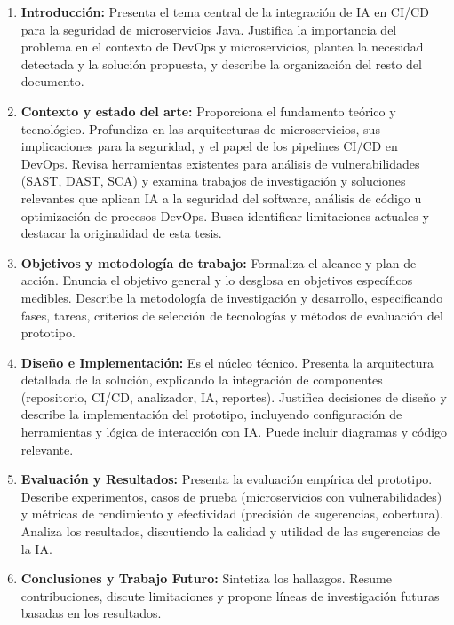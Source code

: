 \begin{enumerate}
\item \textbf{Introducción:} Presenta el tema central de la integración de IA en CI/CD para la seguridad de microservicios Java. Justifica la importancia del problema en el contexto de DevOps y microservicios, plantea la necesidad detectada y la solución propuesta, y describe la organización del resto del documento.

\item \textbf{Contexto y estado del arte:} Proporciona el fundamento teórico y tecnológico. Profundiza en las arquitecturas de microservicios, sus implicaciones para la seguridad, y el papel de los pipelines CI/CD en DevOps. Revisa herramientas existentes para análisis de vulnerabilidades (SAST, DAST, SCA) y examina trabajos de investigación y soluciones relevantes que aplican IA a la seguridad del software, análisis de código u optimización de procesos DevOps. Busca identificar limitaciones actuales y destacar la originalidad de esta tesis.

\item \textbf{Objetivos y metodología de trabajo:} Formaliza el alcance y plan de acción. Enuncia el objetivo general y lo desglosa en objetivos específicos medibles. Describe la metodología de investigación y desarrollo, especificando fases, tareas, criterios de selección de tecnologías y métodos de evaluación del prototipo.

\item \textbf{Diseño e Implementación:} Es el núcleo técnico. Presenta la arquitectura detallada de la solución, explicando la integración de componentes (repositorio, CI/CD, analizador, IA, reportes). Justifica decisiones de diseño y describe la implementación del prototipo, incluyendo configuración de herramientas y lógica de interacción con IA. Puede incluir diagramas y código relevante.

\item \textbf{Evaluación y Resultados:} Presenta la evaluación empírica del prototipo. Describe experimentos, casos de prueba (microservicios con vulnerabilidades) y métricas de rendimiento y efectividad (precisión de sugerencias, cobertura). Analiza los resultados, discutiendo la calidad y utilidad de las sugerencias de la IA.

\item \textbf{Conclusiones y Trabajo Futuro:} Sintetiza los hallazgos. Resume contribuciones, discute limitaciones y propone líneas de investigación futuras basadas en los resultados.
\end{enumerate}

